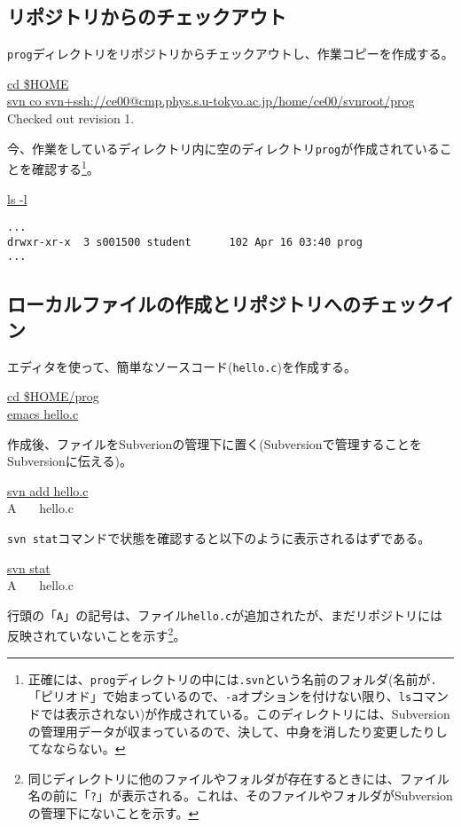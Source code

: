 \subsection{リポジトリからのチェックアウト}

{\tt prog}ディレクトリをリポジトリからチェックアウトし、作業コピーを作成する。
\begin{commandline2}
\prompt \underline{cd \$HOME} \\
\prompt \underline{svn co svn+ssh://ce00@cmp.phys.s.u-tokyo.ac.jp/home/ce00/svnroot/prog} \\
Checked out revision 1.
\end{commandline2} \noindent
今、作業をしているディレクトリ内に空のディレクトリ{\tt prog}が作成されていることを確認する\footnote{正確には、{\tt prog}ディレクトリの中には{\tt .svn}という名前のフォルダ(名前が{\tt .}「ピリオド」で始まっているので、{\tt -a}オプションを付けない限り、{\tt ls}コマンドでは表示されない)が作成されている。このディレクトリには、Subversionの管理用データが収まっているので、決して、中身を消したり変更したりしてなならない。}。
\begin{commandline2}
\prompt \underline{ls -l}
\vspace*{-.7em} 
\begin{verbatim}
...
drwxr-xr-x  3 s001500 student      102 Apr 16 03:40 prog
...
\end{verbatim}
\end{commandline2} \noindent

\subsection{ローカルファイルの作成とリポジトリへのチェックイン}

エディタを使って、簡単なソースコード({\tt hello.c})を作成する。
\begin{commandline2}
\prompt \underline{cd \$HOME/prog} \\
\prompt \underline{emacs hello.c}
\end{commandline2} \noindent
作成後、ファイルをSubverionの管理下に置く(Subversionで管理することをSubversionに伝える)。
\begin{commandline2}
\prompt \underline{svn add hello.c} \\
A \ \ \ hello.c
\end{commandline2} \noindent
{\tt svn stat}コマンドで状態を確認すると以下のように表示されるはずである。
\begin{commandline2}
\prompt \underline{svn stat} \\
A \ \ \ hello.c
\end{commandline2} \noindent
行頭の「{\tt A}」の記号は、ファイル{\tt hello.c}が追加されたが、まだリポジトリには反映されていないことを示す\footnote{同じディレクトリに他のファイルやフォルダが存在するときには、ファイル名の前に「{\tt ?}」が表示される。これは、そのファイルやフォルダがSubversionの管理下にないことを示す。}。

